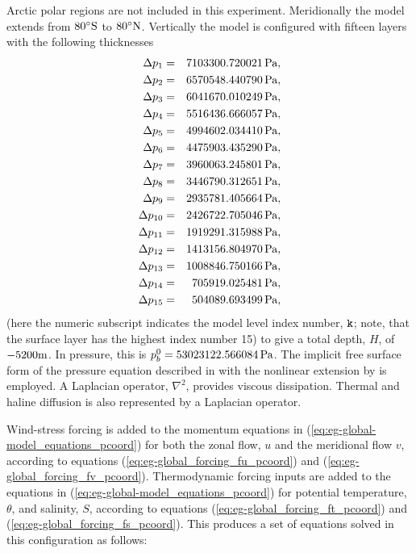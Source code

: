 Arctic polar regions are not included in this experiment. Meridionally
the model extends from $80^{\circ}{\rm S}$ to $80^{\circ}{\rm N}$.
Vertically the model is configured with fifteen layers with the
following thicknesses %
\begin{eqnarray*}
  \Delta p_{1} &=& 7103300.720021\mbox{\,Pa},\\
  \Delta p_{2} &=& 6570548.440790\mbox{\,Pa},\\
  \Delta p_{3} &=& 6041670.010249\mbox{\,Pa},\\
  \Delta p_{4} &=& 5516436.666057\mbox{\,Pa},\\
  \Delta p_{5} &=& 4994602.034410\mbox{\,Pa},\\
  \Delta p_{6} &=& 4475903.435290\mbox{\,Pa},\\
  \Delta p_{7} &=& 3960063.245801\mbox{\,Pa},\\
  \Delta p_{8} &=& 3446790.312651\mbox{\,Pa},\\
  \Delta p_{9} &=& 2935781.405664\mbox{\,Pa},\\
  \Delta p_{10}&=& 2426722.705046\mbox{\,Pa},\\
  \Delta p_{11}&=& 1919291.315988\mbox{\,Pa},\\
  \Delta p_{12}&=& 1413156.804970\mbox{\,Pa},\\
  \Delta p_{13}&=& 1008846.750166\mbox{\,Pa},\\
  \Delta p_{14}&=&  705919.025481\mbox{\,Pa},\\
  \Delta p_{15}&=&  504089.693499\mbox{\,Pa},
\end{eqnarray*}
(here the numeric subscript indicates the model level index number,
${\tt k}$; note, that the surface layer has the highest index number 15) to
give a total depth, $H$, of $-5200{\rm m}$. In pressure, this is
$p_{b}^{0}=53023122.566084\mbox{\,Pa}$. 
The implicit free surface form of the pressure equation described in
\citet{marshall:97a} with the nonlinear extension by
\citet{campin:02} is employed. A Laplacian operator, $\nabla^2$, provides viscous
dissipation. Thermal and haline diffusion is also represented by a Laplacian operator.

Wind-stress forcing is added to the momentum equations in (\ref{eq:eg-global-model_equations_pcoord}) 
for both the zonal flow, $u$ and the meridional flow $v$, according to equations 
(\ref{eq:eg-global_forcing_fu_pcoord}) and (\ref{eq:eg-global_forcing_fv_pcoord}).
Thermodynamic forcing inputs are added to the equations 
in (\ref{eq:eg-global-model_equations_pcoord}) for
potential temperature, $\theta$, and salinity, $S$, according to equations 
(\ref{eq:eg-global_forcing_ft_pcoord}) and (\ref{eq:eg-global_forcing_fs_pcoord}).
This produces a set of equations solved in this configuration as follows:

